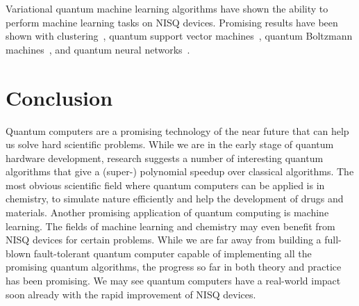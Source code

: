 \documentclass[twocolumn, switch]{article}
\begin{document}
    Variational quantum machine learning algorithms have shown the ability to perform machine learning tasks on NISQ devices.
    Promising results have been shown with clustering~\cite{otterbach2017unsupervised}, quantum support vector machines~\cite{havlivcek2019supervised, schuld2019quantum}, quantum Boltzmann machines~\cite{verdon2017quantum, anschuetz2019realizing}, and quantum neural networks~\cite{qnn-near-term}.
    
    
    \section{Conclusion} \label{sec:conclusion}
    Quantum computers are a promising technology of the near future that can help us solve hard scientific problems.
    While we are in the early stage of quantum hardware development, research suggests a number of interesting quantum algorithms that give a (super-) polynomial speedup over classical algorithms.
    The most obvious scientific field where quantum computers can be applied is in chemistry, to simulate nature efficiently and help the development of drugs and materials.
    Another promising application of quantum computing is machine learning.
    The fields of machine learning and chemistry may even benefit from NISQ devices for certain problems.
    While we are far away from building a full-blown fault-tolerant quantum computer capable of implementing all the promising quantum algorithms, the progress so far in both theory and practice has been promising.
    We may see quantum computers have a real-world impact soon already with the rapid improvement of NISQ devices.
    
    \printbibliography
\end{document}
